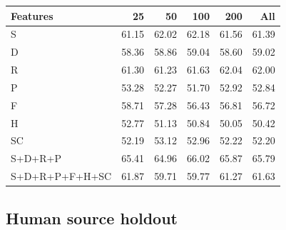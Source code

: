 \begin{center}\small

\begin{tabular}{lrrrrr}\toprule

Features & 25 & 50 & 100 & 200 & All \\ \midrule

S & 61.15 & 62.02 & 62.18 & 61.56 & 61.39 \\

D & 58.36 & 58.86 & 59.04 & 58.60 & 59.02 \\

R & 61.30 & 61.23 & 61.63 & 62.04 & 62.00 \\

P & 53.28 & 52.27 & 51.70 & 52.92 & 52.84 \\

F & 58.71 & 57.28 & 56.43 & 56.81 & 56.72 \\

H & 52.77 & 51.13 & 50.84 & 50.05 & 50.42 \\

SC & 52.19 & 53.12 & 52.96 & 52.22 & 52.20 \\

S+D+R+P & 65.41 & 64.96 & 66.02 & 65.87 & 65.79 \\

S+D+R+P+F+H+SC & 61.87 & 59.71 & 59.77 & 61.27 & 61.63 \\

\bottomrule\end{tabular}\end{center}

\subsection{Human source holdout}

